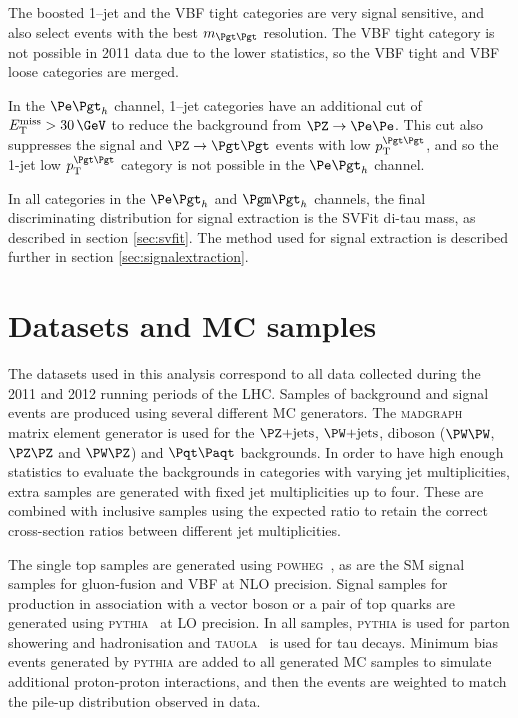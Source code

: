 The boosted 1--jet and the VBF tight categories are very 
signal sensitive, and also select events with the best $m_{\Pgt\Pgt}$ resolution.
The VBF tight category is not possible in 2011 data due to the lower statistics,
so the VBF tight and VBF loose categories are merged. 

In the $\etau$ channel, 1--jet categories have an additional cut of $\MET >
30\,\GeV$ to reduce the background from $\PZ\to\Pe\Pe$. This cut also suppresses the
signal and $\ZToTauTau$ events with low $\pt^{\Pgt\Pgt}$, and so the 1-jet low
$\pt^{\Pgt\Pgt}$ category is not possible in the $\etau$ channel. 

In all categories in the $\etau$ and $\mutau$ channels, the final discriminating
distribution for signal extraction is the SVFit di-tau mass, as described in
section \ref{sec:svfit}. The method used for signal extraction is described
further in section \ref{sec:signalextraction}.

\section{Datasets and MC samples}
\label{sec:dataandMC}

The datasets used in this analysis correspond to all data collected during the 2011 and
2012 running periods of the LHC. Samples of background and signal events are produced using several different
\ac{MC} generators. The \textsc{madgraph}~\cite{Alwall:2011uj} matrix element
generator is used for the $\ZJets$, $\WJets$, diboson ($\PW\PW$, $\PZ\PZ$ and
$\PW\PZ$) and $\ttbar$ backgrounds. 
In order to have high enough statistics to evaluate the
backgrounds in categories with varying jet multiplicities, extra samples are
generated with fixed jet multiplicities up to four. These are combined with
inclusive samples using the expected ratio to retain the correct cross-section
ratios between different jet multiplicities. 

The single top samples are generated using
\textsc{powheg}~\cite{Frixione:2007vw,Alioli:2010xd,Alioli:2010xa}, as are the
\ac{SM} signal samples for gluon-fusion and \ac{VBF} at \ac{NLO} precision. Signal
samples for production in association with a vector boson or a pair of top
quarks are generated using
\textsc{pythia}~\cite{Sjostrand:2006za} at \ac{LO} precision. In all
samples, \textsc{pythia} is used for parton showering and hadronisation and
\textsc{tauola}~\cite{TAUOLA} is used for tau decays. Minimum bias events
generated by \textsc{pythia} are added to all generated \ac{MC} samples
to simulate additional proton-proton interactions, and then the events are
weighted to match the pile-up distribution observed in data. 

